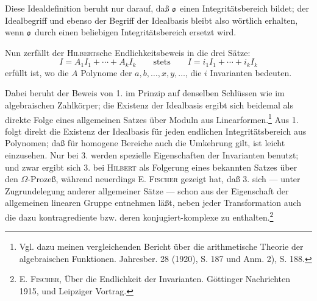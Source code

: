 Diese Idealdefinition beruht nur darauf, daß $\mathfrak o$ einen Integritätsbereich bildet; der Idealbegriff und ebenso der Begriff der Idealbasis bleibt also wörtlich erhalten, wenn $\mathfrak o$ durch einen beliebigen Integritätsbereich ersetzt wird.

Nun zerfällt der \textsc{Hilbert}sche Endlichkeitsbeweis in die drei Sätze:
\[
 I=A_1I_1+\cdots+A_kI_k
 \qquad\text{stets}\qquad
 I=i_1I_1+\cdots+i_kI_k
\]
erfüllt ist, wo die $A$ Polynome der $a,b,\ldots,x,y,\ldots$, die $i$ Invarianten bedeuten.

Dabei beruht der Beweis von 1. im Prinzip auf denselben Schlüssen wie im algebraischen Zahlkörper; die Existenz der Idealbasis ergibt sich beidemal als direkte Folge eines allgemeinen Satzes über Moduln aus Linearformen.\footnote{Vgl. dazu meinen vergleichenden Bericht über die arithmetische Theorie der algebraischen Funktionen. Jahresber. 28 (1920), S. 187 und Anm. 2), S. 188.} Aus 1. folgt direkt die Existenz der Idealbasis für jeden endlichen Integritätsbereich aus Polynomen; daß für homogene Bereiche auch die Umkehrung gilt, ist leicht einzusehen. Nur bei 3. werden spezielle Eigenschaften der Invarianten benutzt; und zwar ergibt sich 3. bei \textsc{Hilbert} als Folgerung eines bekannten Satzes über den $\Omega$-Prozeß, während neuerdings E. \textsc{Fischer} gezeigt hat, daß 3. sich --- unter Zugrundelegung anderer allgemeiner Sätze --- schon aus der Eigenschaft der allgemeinen linearen Gruppe entnehmen läßt, neben jeder Transformation auch die dazu kontragrediente bzw. deren konjugiert-komplexe zu enthalten.\footnote{E. \textsc{Fischer}, Über die Endlichkeit der Invarianten. Göttinger Nachrichten 1915, und Leipziger Vortrag.}

